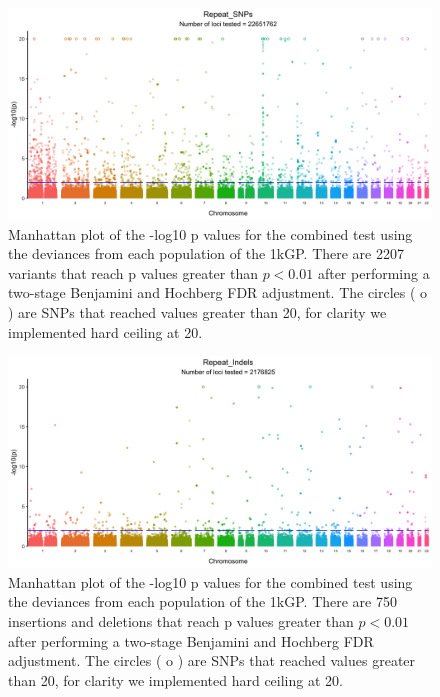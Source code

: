 \documentclass[9pt,lineno]{elife}
\begin{document}
\begin{figure}[h]
\includegraphics[width=\hsize,keepaspectratio]{./Figures/ManhattanPlot_Repeat_SNPs.jpg}

\caption{Manhattan plot of the -log10 p values for the combined test using the deviances from each population of the 1kGP. 
There are 2207 variants that reach p values greater than $ p < 0.01$ after performing a two-stage Benjamini and Hochberg FDR adjustment. 
The circles ( o ) are SNPs that reached values greater than 20, for clarity we implemented hard ceiling at 20.}
\label{RS_Manhattan}
\end{figure}

\begin{figure}[h]
\includegraphics[width=\hsize,keepaspectratio]{./Figures/ManhattanPlot_Repeat_Indels.jpg}

\caption{Manhattan plot of the -log10 p values for the combined test using the deviances from each population of the 1kGP. 
There are 750 insertions and deletions that reach p values greater than $ p < 0.01$ after performing a two-stage Benjamini and Hochberg FDR adjustment. 
The circles ( o ) are SNPs that reached values greater than 20, for clarity we implemented hard ceiling at 20.}
 \label{RI_Manhattan}
\end{figure}
\end{document}
